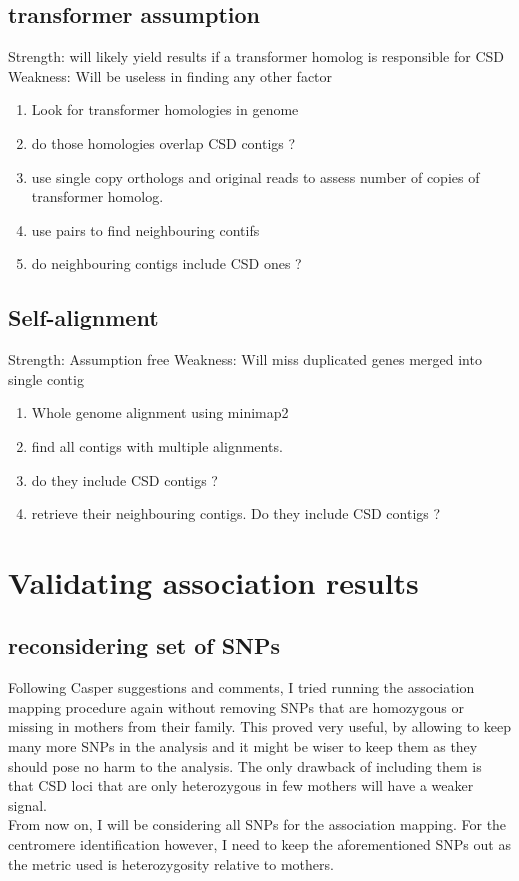 \documentclass[10pt,a4paper]{report}
\begin{document}
\section{transformer assumption}
Strength: will likely yield results if a transformer homolog is responsible for CSD
Weakness: Will be useless in finding any other factor

\begin{enumerate}
\item Look for transformer homologies in genome
\item do those homologies overlap CSD contigs ?
\item use single copy orthologs and original reads to assess number of copies of transformer homolog.
\item use pairs to find neighbouring contifs
\item do neighbouring contigs include CSD ones ?
\end{enumerate}

\section{Self-alignment}
Strength: Assumption free
Weakness: Will miss duplicated genes merged into single contig
\begin{enumerate}
\item Whole genome alignment using minimap2
\item find all contigs with multiple alignments.
\item do they include CSD contigs ?
\item retrieve their neighbouring contigs. Do they include CSD contigs ?
\end{enumerate}

\chapter{Validating association results}

\section{reconsidering set of SNPs}
Following Casper suggestions and comments, I tried running the association mapping procedure again without removing SNPs that are homozygous or missing in mothers from their family. This proved very useful, by allowing to keep many more SNPs in the analysis and it might be wiser to keep them as they should pose no harm to the analysis. The only drawback of including them is that CSD loci that are only heterozygous in few mothers will have a weaker signal. \\
From now on, I will be considering all SNPs for the association mapping. For the centromere identification however, I need to keep the aforementioned SNPs out as the metric used is heterozygosity relative to mothers.
\end{document}

